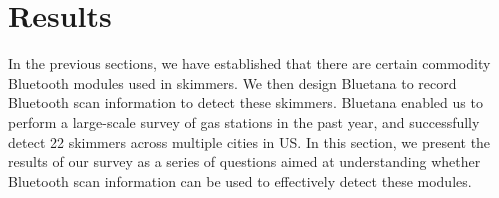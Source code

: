 






\section{Results}
\label{sec:results}

In the previous sections, we have established that there are certain commodity Bluetooth modules used in skimmers. We then design Bluetana to record Bluetooth scan information to detect these skimmers. Bluetana enabled us to perform a large-scale survey of gas stations in the past year, and successfully detect 22 skimmers across multiple cities in US. In this section, we present the results of our survey as a series of questions aimed at understanding whether Bluetooth scan information can be used to effectively detect these modules.

